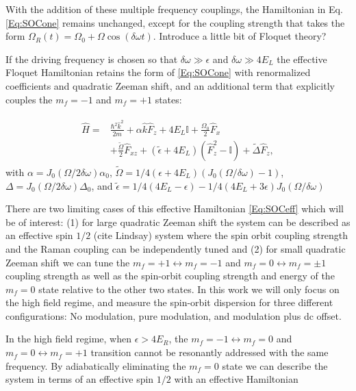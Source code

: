 With the addition of these multiple frequency couplings, the Hamiltonian in Eq.\ref{Eq:SOCone} remains unchanged, except for the coupling strength that takes the form $	\Omega_R(t)=\Omega_0 + \Omega\cos(\delta\omega t)$. Introduce a little bit of Floquet theory?

If the driving frequency is chosen so that  $\delta\omega \gg \epsilon$ and $\delta\omega \gg 4E_L$ the effective Floquet Hamiltonian retains the form of \ref{Eq:SOCone} with renormalized coefficients and quadratic Zeeman shift, and an additional term that explicitly couples the $m_f=-1$ and $m_f=+1$ states:


\begin{align}
	\begin{split}
		\hat{H} = &\frac{\hbar^2\hat{k}^2}{2m} + \alpha\hat{k}\hat{F}_z +4E_L\mathbb{I} + \frac{\Omega_0}{2}\hat{F}_x \\
		&+ \frac{\tilde{\Omega}}{2}\hat{F}_{xz} +(\tilde{\epsilon}+4E_L)(\hat{F}_z^2-\mathbb{I}) +\tilde{\Delta}\hat{F}_z, 
		\label{Eq:SOCeff}
	\end{split}
\end{align}	
%
with $\alpha= J_0(\Omega/2\delta\omega)\alpha_0$, $\tilde{\Omega}=1/4(\epsilon+4E_L) (J_0(\Omega/\delta\omega)-1)$, $\Delta=J_0(\Omega/2\delta\omega)\Delta_0$, and $\tilde{\epsilon}= 1/4(4E_L-\epsilon) - 
1/4(4E_L + 3 \epsilon) J_0( \Omega/\delta\omega)$


There are two limiting cases of this effective Hamiltonian \ref{Eq:SOCeff} which will be of interest: (1) for large quadratic Zeeman shift the system can be described as an effective spin $1/2$ (cite Lindsay) system where the spin orbit coupling strength and the Raman coupling can be independently tuned and (2) for small quadratic Zeeman shift we can tune the $m_f=+1\leftrightarrow m_f=-1$ and $m_f=0\leftrightarrow m_f=\pm 1$ coupling strength as well as the spin-orbit coupling strength and energy of the $m_f=0$ state relative to the other two states. In this work we will only focus on the high field regime, and measure the spin-orbit dispersion for three  different configurations: No modulation, pure modulation, and modulation plus dc offset. 



In the high field regime, when $\epsilon > 4E_R$, the $m_f=-1\leftrightarrow m_f=0$ and $m_f=0 \leftrightarrow m_f=+1$ transition cannot be resonantly addressed with the same frequency. By adiabatically eliminating the $m_f=0$ state we can describe the system in terms of an effective spin $1/2$  with an effective Hamiltonian

